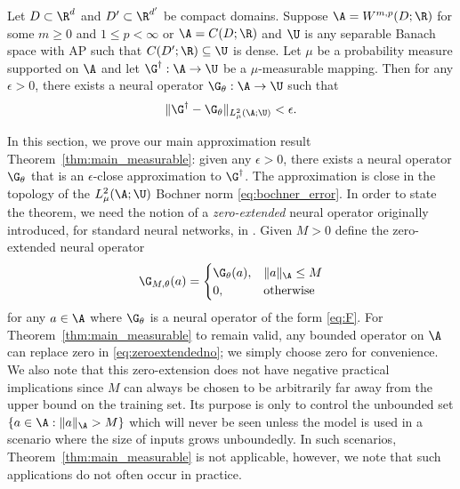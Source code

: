 \begin{theorem}
Let \(D \subset \R^d\) and \(D' \subset \R^{d'}\) be compact domains. Suppose \(\A = W^{m,p}(D;\R)\) for some \(m \geq 0\) and \(1 \leq p < \infty\) or \(\A = C(D;\R)\) and \(\U\) is any separable Banach space with AP such that \(C(D';\R) \subseteq \U\) is dense. Let \(\mu\) be a probability measure supported on \(\A\) and let \(\G^\dagger : \A \to \U\) be a \(\mu\)-measurable mapping. Then for any  \(\epsilon > 0\), there exists a neural operator \(\G_\theta : \A \to \U \) such that
\[\|\G^\dagger - \G_\theta \|_{L^2_\mu (\A;\U)} < \epsilon.\]

\end{theorem}




In this section, we prove our main approximation result Theorem~\ref{thm:main_measurable}: given any \(\epsilon > 0\),  there exists a neural operator \(\G_\theta\) that is an \(\epsilon\)-close approximation to \(\G^\dagger\). The approximation is close in the topology of the \(L^2_\mu(\A;\U)\) Bochner norm \eqref{eq:bochner_error}. In order to state the theorem, we need the notion of a \textit{zero-extended} neural operator originally introduced, for standard neural networks, in \cite{Kovachki}. Given \(M > 0\) define the zero- extended neural operator
\begin{equation}
    \label{eq:zeroextendedno}
    \G_{M,\theta}(a) = \begin{cases}
    \G_\theta(a), & \|a\|_\A \leq M \\
    0, & \text{otherwise}
    \end{cases}
\end{equation}
for any \(a \in \A\) where \(\G_\theta\) is a neural operator of the form \eqref{eq:F}. For Theorem~\ref{thm:main_measurable} to remain valid, any bounded operator on \(\A\) can replace zero in \eqref{eq:zeroextendedno}; we simply choose zero for convenience. We also note that this zero-extension does not have negative practical implications since \(M\) can always be chosen to be arbitrarily far away from the upper bound on the training set. 
Its purpose is only to control the unbounded set \(\{a \in \A : \|a\|_\A > M\}\) which will never be seen unless the model is used in a scenario where the size of inputs grows unboundedly. In such scenarios, Theorem~\ref{thm:main_measurable} is not applicable, however, we note that such applications do not often occur in practice. 

